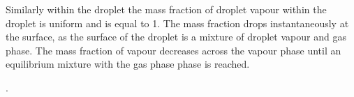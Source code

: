 \documentclass[../Interim_Report_Master]{subfiles}
\begin{document}
Similarly within the droplet the mass fraction of droplet vapour within the droplet is uniform and is equal to 1. The mass fraction drops instantaneously at the surface, as the surface of the droplet is a mixture of droplet vapour and gas phase. The mass fraction of vapour decreases across the vapour phase until an equilibrium mixture with the gas phase phase is reached. 

 \cite{pinheiro_vedovoto_2018}.


%
\end{document}
